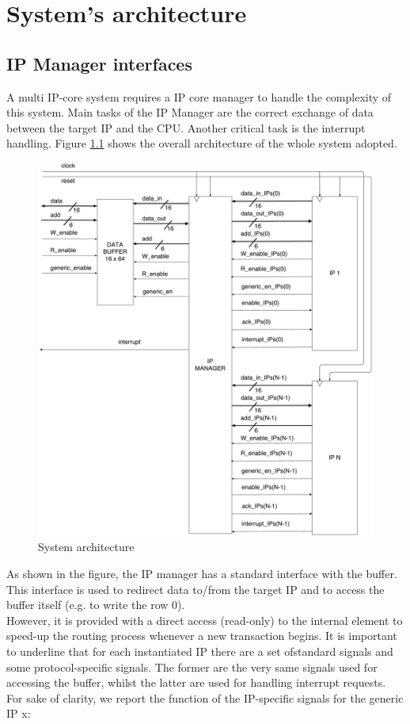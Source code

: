 \chapter{System's architecture}
\label{chap1}
\section{IP Manager interfaces}
A multi IP-core system requires a IP core manager to handle the complexity of this system.
Main tasks of the IP Manager are the correct exchange of data between the target IP and the CPU. Another critical task is the interrupt handling. Figure \ref{00fig} shows the overall architecture of the whole system adopted. 
	\begin{figure}[h]
		\centering
		\includegraphics[width=\textwidth]{chapters/figures/interface.pdf}  
		\caption{System architecture}
		\label{00fig}
	\end{figure}
	
	As shown in the figure, the IP manager has a standard interface with the buffer. This interface is used to redirect data to/from the target IP and to access the buffer itself (e.g. to write the row 0).\\ However, it is
	provided with a direct access (read-only) to the internal element to speed-up the routing process whenever a new transaction begins. It is important to underline that for each instantiated IP there are a set ofstandard signals and some protocol-specific signals. The former are the very same signals used for accessing the buffer, whilst the latter are used for handling interrupt requests. For sake of clarity, we report the function of the IP-specific signals for the generic IP x:
